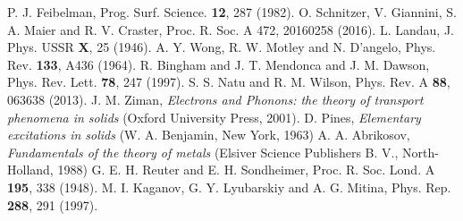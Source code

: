 \documentclass[aps,reprint]{revtex4-1}
\begin{document}
\begin{thebibliography}{9}
P. J. Feibelman, Prog. Surf. Science. \textbf{12}, 287 (1982).
O. Schnitzer, V. Giannini, S. A. Maier and R. V. Craster, Proc. R. Soc. A 472, 20160258 (2016). 
L. Landau, J. Phys. USSR \textbf{X}, 25 (1946).
A. Y. Wong, R. W. Motley and N. D'angelo, Phys. Rev. \textbf{133}, A436 (1964).
R. Bingham and J. T. Mendonca and J. M. Dawson, Phys. Rev. Lett. \textbf{78}, 247 (1997).
S. S. Natu and R. M. Wilson, Phys. Rev. A \textbf{88}, 063638 (2013).
J. M. Ziman, \textit{Electrons and Phonons: the theory of transport phenomena in solids} (Oxford University Press, 2001).
D. Pines, \textit{Elementary excitations in solids} (W. A. Benjamin, New York, 1963)
A. A. Abrikosov, \textit{Fundamentals of the theory of metals} (Elsiver Science Publishers B. V., North-Holland, 1988)
G. E. H. Reuter and E. H. Sondheimer, Proc. R. Soc. Lond. A \textbf{195}, 338 (1948).
M. I. Kaganov, G. Y. Lyubarskiy and A. G.  Mitina, Phys. Rep. \textbf{288}, 291 (1997).
\end{thebibliography}
\end{document}
